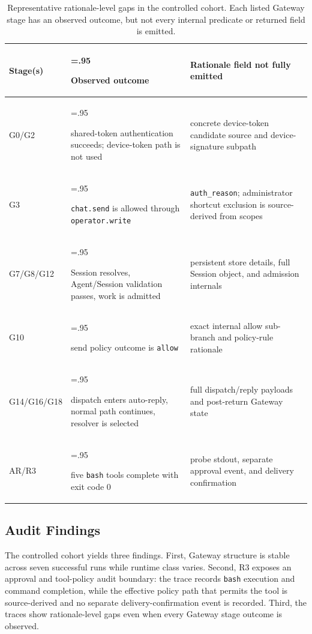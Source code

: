 \documentclass[11pt,a4paper]{article}
\begin{document}
\begin{table}[H]
\centering
\caption{Representative rationale-level gaps in the controlled cohort.
Each listed Gateway stage has an observed outcome, but not every internal
predicate or returned field is emitted.}
\label{tab:rationale-gaps}
{\scriptsize
\begin{tabularx}{\linewidth}{@{}>{\raggedright\arraybackslash}p{.13\linewidth} >{\hsize=.95\hsize\raggedright\arraybackslash}X >{\hsize=1.05\hsize\raggedright\arraybackslash}X@{}}
\toprule
Stage(s) & Observed outcome & Rationale field not fully emitted \\
\midrule
G0/G2 & shared-token authentication succeeds; device-token path is not used &
concrete device-token candidate source and device-signature subpath \\
G3 & \texttt{chat.send} is allowed through \texttt{operator.write} &
\texttt{auth\_reason}; administrator shortcut exclusion is source-derived from scopes \\
G7/G8/G12 & Session resolves, Agent/Session validation passes, work is admitted &
persistent store details, full Session object, and admission internals \\
G10 & send policy outcome is \texttt{allow} &
exact internal allow sub-branch and policy-rule rationale \\
G14/G16/G18 & dispatch enters auto-reply, normal path continues, resolver is selected &
full dispatch/reply payloads and post-return Gateway state \\
AR/R3 & five \texttt{bash} tools complete with exit code 0 &
probe stdout, separate approval event, and delivery confirmation \\
\bottomrule
\end{tabularx}
}
\end{table}

\subsection{Audit Findings}

The controlled cohort yields three findings. First, Gateway structure is
stable across seven successful runs while runtime class varies. Second,
R3 exposes an approval and tool-policy audit boundary: the trace records
\texttt{bash} execution and command completion, while the effective
policy path that permits the tool is source-derived and no separate
delivery-confirmation event is recorded. Third, the traces show
rationale-level gaps even when every Gateway stage outcome is observed.
\end{document}
